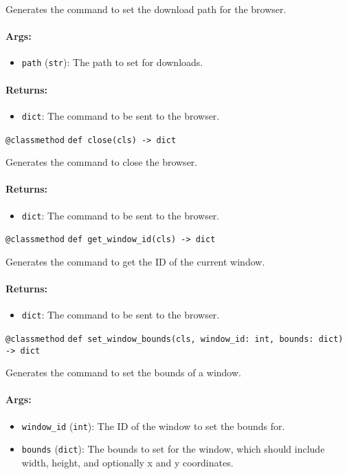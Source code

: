 \documentclass{article}
\begin{document}
\noindent Generates the command to set the download path for the browser.

\paragraph{Args:}
\begin{itemize}
    \item \texttt{path} (\texttt{str}): The path to set for downloads.
\end{itemize}

\paragraph{Returns:}
\begin{itemize}
    \item \texttt{dict}: The command to be sent to the browser.
\end{itemize}

\noindent\texttt{@classmethod}
\noindent\texttt{def close(cls) -> dict}

\noindent Generates the command to close the browser.

\paragraph{Returns:}
\begin{itemize}
    \item \texttt{dict}: The command to be sent to the browser.
\end{itemize}

\noindent\texttt{@classmethod}
\noindent\texttt{def get\_window\_id(cls) -> dict}

\noindent Generates the command to get the ID of the current window.

\paragraph{Returns:}
\begin{itemize}
    \item \texttt{dict}: The command to be sent to the browser.
\end{itemize}

\noindent\texttt{@classmethod}
\noindent\texttt{def set\_window\_bounds(cls, window\_id: int, bounds: dict) -> dict}

\noindent Generates the command to set the bounds of a window.

\paragraph{Args:}
\begin{itemize}
    \item \texttt{window\_id} (\texttt{int}): The ID of the window to set the bounds for.
    \item \texttt{bounds} (\texttt{dict}): The bounds to set for the window, which should include width, height, and optionally x and y coordinates.
\end{itemize}
\end{document}
